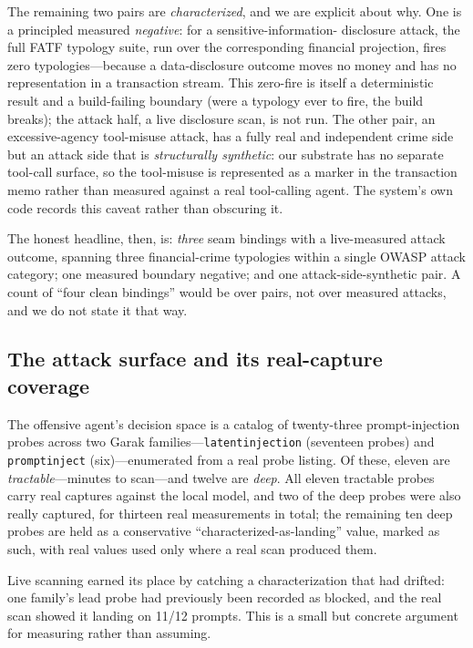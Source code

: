 \documentclass[10pt,twocolumn]{article}
\begin{document}
The remaining two pairs are \emph{characterized}, and we are explicit about why.
One is a principled measured \emph{negative}: for a sensitive-information-
disclosure attack, the full FATF typology suite, run over the corresponding
financial projection, fires zero typologies---because a data-disclosure outcome
moves no money and has no representation in a transaction stream. This zero-fire
is itself a deterministic result and a build-failing boundary (were a typology
ever to fire, the build breaks); the attack half, a live disclosure scan, is not
run. The other pair, an excessive-agency tool-misuse attack, has a fully real and
independent crime side but an attack side that is \emph{structurally synthetic}:
our substrate has no separate tool-call surface, so the tool-misuse is
represented as a marker in the transaction memo rather than measured against a
real tool-calling agent. The system's own code records this caveat rather than
obscuring it.

The honest headline, then, is: \emph{three} seam bindings with a live-measured
attack outcome, spanning three financial-crime typologies within a single OWASP
attack category; one measured boundary negative; and one attack-side-synthetic
pair. A count of ``four clean bindings'' would be over pairs, not over measured
attacks, and we do not state it that way.

\subsection{The attack surface and its real-capture coverage}

The offensive agent's decision space is a catalog of twenty-three
prompt-injection probes across two Garak families---\texttt{latentinjection}
(seventeen probes) and \texttt{promptinject} (six)---enumerated from a real probe
listing. Of these, eleven are \emph{tractable}---minutes to scan---and twelve are
\emph{deep}. All eleven tractable probes carry real captures against the local
model, and two of the deep probes were also really captured, for thirteen real
measurements in total; the remaining ten deep probes are held as a conservative
``characterized-as-landing'' value, marked as such, with real values used only
where a real scan produced them.

Live scanning earned its place by catching a characterization that had drifted:
one family's lead probe had previously been recorded as blocked, and the real
scan showed it landing on 11/12 prompts. This is a small but concrete
argument for measuring rather than assuming.
\end{document}
